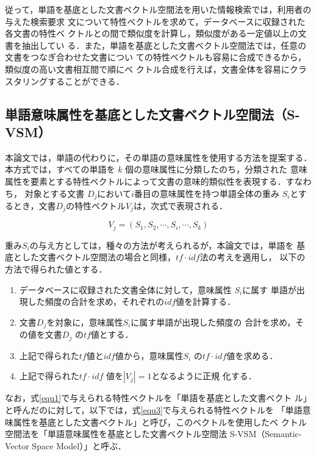 従って，単語を基底とした文書ベクトル空間法を用いた情報検索では，利用者の与えた検索要求
文について特性ベクトルを求めて，データベースに収録された各文書の特性ベ
クトルとの間で類似度を計算し，類似度がある一定値以上の文書を抽出してい
る．また，単語を基底とした文書ベクトル空間法では，任意の文書をつなぎ合わせた文書につい
ての特性ベクトルも容易に合成できるから，類似度の高い文書相互間で順にベ
クトル合成を行えば，文書全体を容易にクラスタリングすることができる．

\subsection{単語意味属性を基底とした文書ベクトル空間法（S-VSM）}
\label{word_meaning}

本論文では，単語の代わりに，その単語の意味属性を使用する方法を提案する．
本方式では，すべての単語を $k$ 個の意味属性に分類したのち，分類された
意味属性を要素とする特性ベクトルによって文書の意味的類似性を表現する．すなわち，
対象とする文書 $ D_j$において$i$番目の意味属性を持つ単語全体の重み
$S_i$とするとき，文書$D_j$の特性ベクトル$V_j$は，次式で表現される．

\begin{equation}
\label{equ3}
  V_j=(S_1,S_2, \cdots ,S_i, \cdots ,S_k) 
\end{equation}

重み$S_i$の与え方としては，種々の方法が考えられるが，本論文では，単語を
基底とした文書ベクトル空間法の場合と同様，$tf \cdot idf$法の考えを適用し，
以下の方法で得られた値とする．

\begin{enumerate}

\item データベースに収録された文書全体に対して，意味属性 $S_i$に属す
単語が出現した頻度の合計を求め，それぞれの$idf$値を計算する．

\item 文書$ D_j $を対象に，意味属性$ S_i $に属す単語が出現した頻度の
合計を求め，その値を文書$ D_j $ の$tf$値とする．

\item 上記で得られた$tf$値と$idf$値から，意味属性$ S_i $ の$tf \cdot
idf $値を求める．

\item 上記で得られた$tf \cdot idf $ 値を$ | V_j | = 1 $となるように正規
化する．

\end{enumerate}

なお，式\ref{equ1}で与えられる特性ベクトルを「単語を基底とした文書ベクト
ル」と呼んだのに対して，以下では，式\ref{equ3}で与えられる特性ベクトルを
「単語意味属性を基底とした文書ベクトル」と呼び，このベクトルを使用したベ
クトル空間法を「単語意味属性を基底とした文書ベクトル空間法
S-VSM（Semantic-Vector Space Model）」と呼ぶ．

